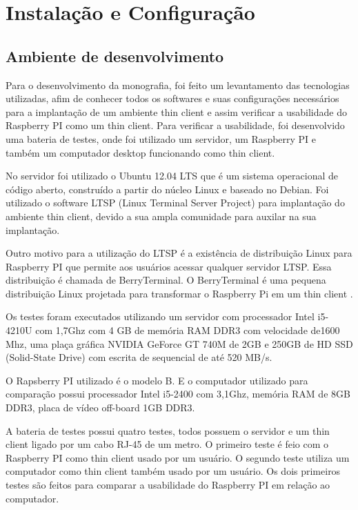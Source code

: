 \documentclass[
	12pt,				%
	openright,			%
	twoside,			%
	a4paper,			%
	chapter=TITLE,		%
	english,			%
	brazil				%
	]{abntex2}
\begin{document}
\part{Instalação e Configuração}

\chapter{Ambiente de desenvolvimento}
\label{AmbienteTest}
Para o desenvolvimento da monografia, foi feito um levantamento das tecnologias utilizadas, afim de conhecer todos os softwares e suas configurações necessários para a implantação de um ambiente thin client e assim verificar a usabilidade do Raspberry PI como um thin client. Para verificar a usabilidade, foi desenvolvido uma bateria de testes, onde foi utilizado um servidor, um Raspberry PI e também um computador desktop funcionando como thin client. 

No servidor foi utilizado o Ubuntu 12.04 LTS que é um sistema operacional de código aberto, construído a partir do núcleo Linux e baseado no Debian\cite{ubuntu}. Foi utilizado o software LTSP (Linux Terminal Server Project) para implantação do ambiente thin client, devido a sua ampla comunidade para auxilar na sua implantação. 

Outro motivo para a utilização do LTSP é a existência de distribuição Linux para Raspberry PI que permite aos usuários acessar qualquer servidor LTSP. Essa distribuição é chamada de BerryTerminal. O BerryTerminal é uma pequena distribuição Linux projetada para transformar o Raspberry Pi em um thin client \cite{berryterminal}.

Os testes foram executados utilizando um servidor com processador Intel i5-4210U com 1,7Ghz com 4 GB de memória RAM DDR3 com velocidade de1600 Mhz, uma plaça gráfica NVIDIA GeForce GT 740M de 2GB e 250GB de HD SSD (Solid-State Drive) com escrita de sequencial de até 520 MB/s.
	
O Rapsberry PI utilizado é o modelo B. E o computador utilizado para comparação possui processador Intel i5-2400 com 3,1Ghz, memória RAM de 8GB DDR3, placa de vídeo off-board 1GB DDR3.

A bateria de testes possui quatro testes, todos possuem o servidor e um thin client ligado por um cabo RJ-45 de um metro. O primeiro teste é feio com o Raspberry PI como thin client usado por um usuário.  O segundo teste utiliza um computador como thin client também usado por um usuário. Os dois primeiros testes são feitos para comparar a usabilidade do Raspberry PI  em relação ao computador. 
\end{document}

